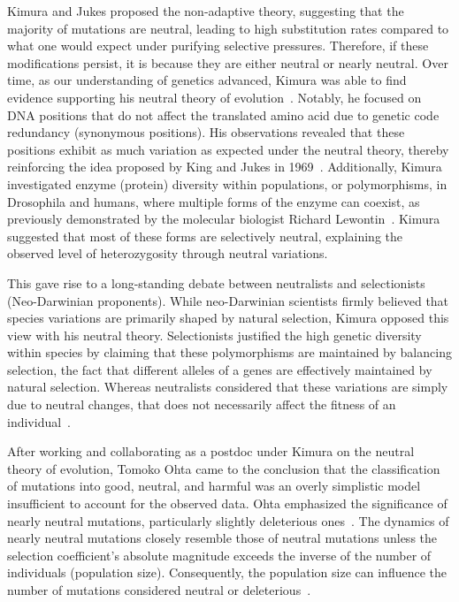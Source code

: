 Kimura and Jukes proposed the non-adaptive theory, suggesting that the majority of mutations are neutral, leading to high substitution rates compared to what one would expect under purifying selective pressures. Therefore, if these modifications persist, it is because they are either neutral or nearly neutral. Over time, as our understanding of genetics advanced, Kimura was able to find evidence supporting his neutral theory of evolution~\citep{kimura_recent_1991}. Notably, he focused on DNA positions that do not affect the translated amino acid due to genetic code redundancy (\gls{synonymous} positions). His observations revealed that these positions exhibit as much variation as expected under the neutral theory, thereby reinforcing the idea proposed by King and Jukes in 1969~\citep{kimura_preponderance_1977}. Additionally, Kimura investigated enzyme (protein) diversity within populations, or polymorphisms, in Drosophila and humans, where multiple forms of the enzyme can coexist, as previously demonstrated by the molecular biologist Richard Lewontin~\citep{lewontin_molecular_1966, harris_enzyme_1966, charlesworth_hubby_2016}. Kimura suggested that most of these forms are selectively neutral, explaining the observed level of heterozygosity through neutral variations.

This gave rise to a long-standing debate between neutralists and selectionists (Neo-Darwinian proponents). While neo-Darwinian scientists firmly believed that species variations are primarily shaped by natural selection, Kimura opposed this view with his neutral theory. Selectionists justified the high genetic diversity within species by claiming that these polymorphisms are maintained by balancing selection, the fact that different alleles of a genes are effectively maintained by natural selection. Whereas neutralists considered that these variations are simply due to neutral changes, that does not necessarily affect the fitness of an individual~\citep{kimura_protein_1971, nei_selectionism_2005, lee_balancing_2021}.

After working and collaborating as a postdoc under Kimura on the neutral theory of evolution, Tomoko Ohta came to the conclusion that the classification of mutations into good, neutral, and harmful was an overly simplistic model insufficient to account for the observed data. Ohta emphasized the significance of nearly neutral mutations, particularly slightly deleterious ones~\citep{ohta_slightly_1973}. The dynamics of nearly neutral mutations closely resemble those of neutral mutations unless the selection coefficient's absolute magnitude exceeds the inverse of the number of individuals (population size). Consequently, the population size can influence the number of mutations considered neutral or deleterious~\citep{ohta_nearly_1992}. 

